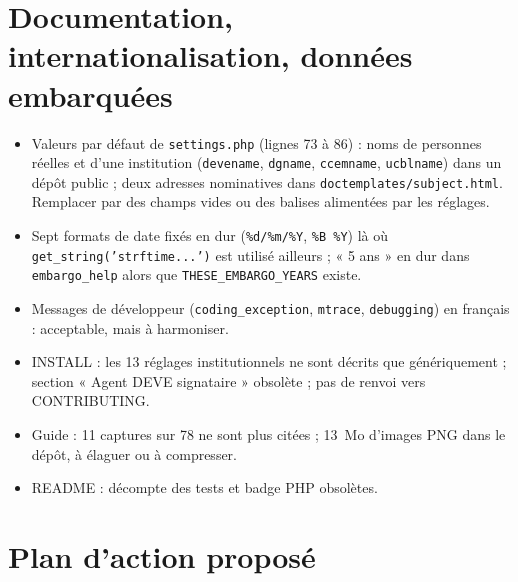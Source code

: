 \documentclass[11pt,a4paper]{article}
\newcommand{\fichier}[1]{\texttt{\small #1}}
\newcommand{\code}[1]{\texttt{#1}}
\begin{document}
\section{Documentation, internationalisation, données embarquées}

\begin{itemize}
  \item Valeurs par défaut de \fichier{settings.php} (lignes 73 à 86) : noms de personnes réelles
    et d'une institution (\code{devename}, \code{dgname}, \code{ccemname}, \code{ucblname}) dans
    un dépôt public ; deux adresses nominatives dans \fichier{doctemplates/subject.html}. Remplacer
    par des champs vides ou des balises alimentées par les réglages.
  \item Sept formats de date fixés en dur (\code{\%d/\%m/\%Y}, \code{\%B \%Y}) là où
    \code{get\_string('strftime...')} est utilisé ailleurs ; « 5 ans » en dur dans
    \code{embargo\_help} alors que \code{THESE\_EMBARGO\_YEARS} existe.
  \item Messages de développeur (\code{coding\_exception}, \code{mtrace}, \code{debugging}) en
    français : acceptable, mais à harmoniser.
  \item INSTALL : les 13 réglages institutionnels ne sont décrits que génériquement ; section
    « Agent DEVE signataire » obsolète ; pas de renvoi vers CONTRIBUTING.
  \item Guide : 11 captures sur 78 ne sont plus citées ; 13~Mo d'images PNG dans le dépôt, à
    élaguer ou à compresser.
  \item README : décompte des tests et badge PHP obsolètes.
\end{itemize}

\section{Plan d'action proposé}
\end{document}
